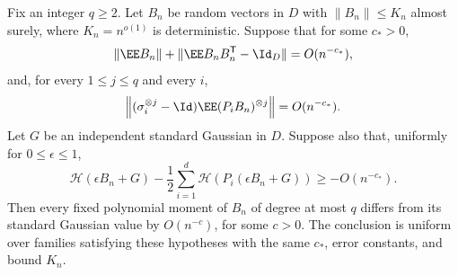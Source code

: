 \begin{lemma}\label{ent:gaussian-criterion}
Fix an integer \(q\ge2\). Let \(B_n\) be random vectors in \(D\)
with \(\|B_n\|\le K_n\) almost surely, where \(K_n=n^{o(1)}\) is
deterministic. Suppose that for some \(c_*>0\),
\[
 \|\EE B_n\|+\|\EE B_nB_n^{\mathsf T}-\Id_D\|=O(n^{-c_*}),
\]
and, for every \(1\le j\le q\) and every \(i\),
\[
 \left\|(\sigma_i^{\otimes j}-\Id)
              \EE(P_iB_n)^{\otimes j}\right\|=O(n^{-c_*}).
\]
Let \(G\) be an independent standard Gaussian in \(D\). Suppose also
that, uniformly for \(0\le\epsilon\le1\),
\[
 \mathcal H(\epsilon B_n+G)
 -\frac12\sum_{i=1}^d\mathcal H(P_i(\epsilon B_n+G))
 \ge-O(n^{-c_*}).
\]
Then every fixed polynomial moment of \(B_n\) of degree at most
\(q\) differs from its standard Gaussian value by \(O(n^{-c})\),
for some \(c>0\). The conclusion is uniform over families satisfying
these hypotheses with the same \(c_*\), error constants, and bound
\(K_n\).
\end{lemma}

